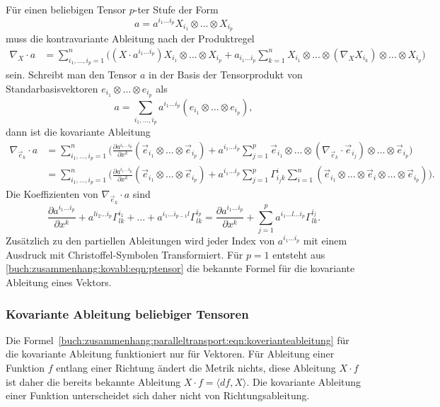Für einen beliebigen Tensor $p$-ter Stufe der Form
\[
a
=
a^{i_1\dots i_p}
X_{i_1}\otimes\dots\otimes X_{i_p}
\]
muss die kontravariante Ableitung nach der Produktregel
\begin{align*}
\nabla_X\cdot a
&=
\sum_{i_1,\dots,i_p=1}^n
\biggl(
(X\cdot a^{i_1\dots i_p}) X_{i_1}\otimes\dots\otimes X_{i_p}
+
a_{i_1\dots i_p}
\sum_{k=1}^n
X_{i_1}\otimes\dots\otimes(\nabla_X X_{i_k})\otimes\dots\otimes X_{i_p}
\biggr)
\end{align*}
sein.
Schreibt man den Tensor $a$ in der Basis der Tensorprodukt von
Standarbasisvektoren $e_{i_1}\otimes\dots\otimes e_{i_p}$ als
\[
a
=
\sum_{i_1,\dots,i_p}
a^{i_1\dots i_p}
(e_{i_1}\otimes\dots\otimes e_{i_p}),
\]
dann ist die kovariante Ableitung
\begin{align*}
\nabla_{\vec{e}_k} \cdot a
&=
\sum_{i_1,\dots,i_p=1}^n
\biggl(
\frac{\partial a^{i_1\dots i_p}}{\partial x^k}
(\vec{e}_{i_1}\otimes\dots\otimes\vec{e}_{i_p})
+
a^{i_1\dots i_p}
\sum_{j=1}^p
\vec{e}_{i_1}\otimes\dots\otimes(\nabla_{\vec{e}_k}\cdot\vec{e}_{i_j})\otimes\dots\otimes \vec{e}_{i_p}
\biggr)
\\
&=
\sum_{i_1,\dots,i_p=1}^n
\biggl(
\frac{\partial a^{i_1\dots i_p}}{\partial x^k}
(\vec{e}_{i_1}\otimes\dots\otimes\vec{e}_{i_p})
+
a^{i_1\dots i_p}
\sum_{j=1}^p
\Gamma^i_{i_jk}
\sum_{i=1}^n
(\vec{e}_{i_1}\otimes\dots\otimes \vec{e}_i \otimes\dots\otimes \vec{e}_{i_p})
\biggr).
\end{align*}
Die Koeffizienten von $\nabla_{\vec{e}_k}\cdot a$ sind
\begin{equation}
\frac{\partial a^{i_1\dots i_p}}{\partial x^k}
+
a^{li_2\dots i_p}
\Gamma^{i_1}_{lk}
+
\dots
+
a^{i_1\dots i_{p-1}l}
\Gamma^{i_p}_{lk}
=
\frac{\partial a^{i_1\dots i_p}}{\partial x^k}
+
\sum_{j=1}^p
a^{i_1\dots l\dots i_p}
\Gamma^{i_j}_{lk}.
\label{buch:zusammenhang:kovabl:eqn:ptensor}
\end{equation}
Zusätzlich zu den partiellen Ableitungen wird jeder Index von
$a^{i_1\dots i_p}$ mit einem Ausdruck mit Christoffel-Symbolen
Transformiert.
Für $p=1$ entsteht aus 
\eqref{buch:zusammenhang:kovabl:eqn:ptensor}
die bekannte Formel für die kovariante Ableitung eines Vektors.

%
%
\subsubsection{Kovariante Ableitung beliebiger Tensoren}
Die Formel~\eqref{buch:zusammenhang:paralleltransport:eqn:koverianteableitung}
für die kovariante Ableitung funktioniert nur für Vektoren.
Für Ableitung einer Funktion $f$ entlang einer Richtung ändert
die Metrik nichts, diese Ableitung $X\cdot f$ ist daher die bereits
bekannte Ableitung $X\cdot f = \langle df,X\rangle$.
Die kovariante Ableitung einer Funktion unterscheidet sich daher nicht
von Richtungsableitung.

